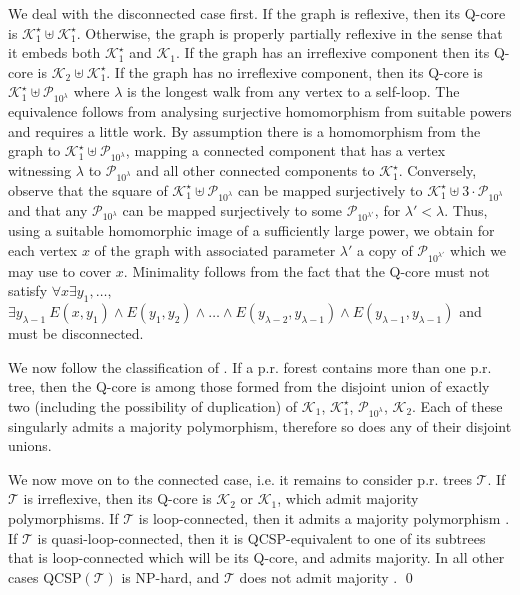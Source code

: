 \documentclass{LMCS}
\begin{document}
  We deal with the disconnected case first.
  If the graph is reflexive, then its Q-core is $\mathcal{K}_1^\star \uplus\mathcal{K}_1^\star$.
  Otherwise, the graph is properly partially reflexive in the sense
  that it embeds both $\mathcal{K}_1^\star$ and $\mathcal{K}_1$. If the graph has an
  irreflexive component then its Q-core is $\mathcal{K}_2 \uplus\mathcal{K}_1^\star$.
  If the graph has no irreflexive component, then its Q-core is
  $\mathcal{K}_1^\star \uplus \mathcal{P}_{10^\lambda}$ where $\lambda$ is the longest walk
  from any vertex to a self-loop. The equivalence follows from
  analysing surjective homomorphism from suitable powers and requires
  a little work. By assumption there is a homomorphism from the
  graph to $\mathcal{K}_1^\star \uplus \mathcal{P}_{10^\lambda}$, mapping a connected
  component that has a vertex witnessing $\lambda$ to
  $\mathcal{P}_{10^\lambda}$ and all other connected components to
  $\mathcal{K}_1^\star$.
  Conversely, observe that the square of $\mathcal{K}_1^\star \uplus \mathcal{P}_{10^\lambda}$
  can be mapped surjectively to $\mathcal{K}_1^\star \uplus 3\cdot \mathcal{P}_{10^\lambda}$ and
  that any $\mathcal{P}_{10^\lambda}$ can be mapped surjectively to some
  $\mathcal{P}_{10^{\lambda'}}$, for $\lambda'< \lambda$.
  Thus, using a suitable homomorphic image of a sufficiently large
  power, we obtain for each vertex $x$ of the graph with associated
  parameter $\lambda'$ a copy of $\mathcal{P}_{10^{\lambda'}}$ which we may use
  to cover $x$.
  Minimality follows from the fact 
  that the Q-core must not satisfy $\forall x \exists
  y_1,\ldots,$ $\exists y_{\lambda-1} \ E(x,y_1) \wedge E(y_1,y_2) \wedge \ldots
  \wedge E(y_{\lambda-2},y_{\lambda-1}) \wedge E(y_{\lambda-1},y_{\lambda-1})$ 
  and must be disconnected.
 
 
We now follow the classification of \cite{QCSPforests}. If a \mbox{p.r.}
forest contains more than one \mbox{p.r.} tree, then the Q-core is
among those formed from the disjoint union of exactly two (including
the possibility of duplication) of $\mathcal{K}_1$, $\mathcal{K}^\star_1$, $\mathcal{P}_{10^\lambda}$,
$\mathcal{K}_2$. Each of these singularly admits a majority polymorphism, therefore so does any of their disjoint unions. 

We now move on to the connected case, \mbox{i.e.} it remains to consider \mbox{p.r.} trees $\mathcal{T}$. If $\mathcal{T}$ is
irreflexive, then its Q-core is $\mathcal{K}_2$ or $\mathcal{K}_1$, which admit
majority polymorphisms. If $\mathcal{T}$ is loop-connected, then it admits a
majority polymorphism \cite{QCSPforests}. If $\mathcal{T}$ is
quasi-loop-connected, then it is QCSP-equivalent to one of its
subtrees that is loop-connected \cite{QCSPforests} which will be its
Q-core, and admits majority. In all other cases QCSP$(\mathcal{T})$ is NP-hard, and $\mathcal{T}$ does not
admit majority \cite{QCSPforests}. 
\qed
\end{document}
